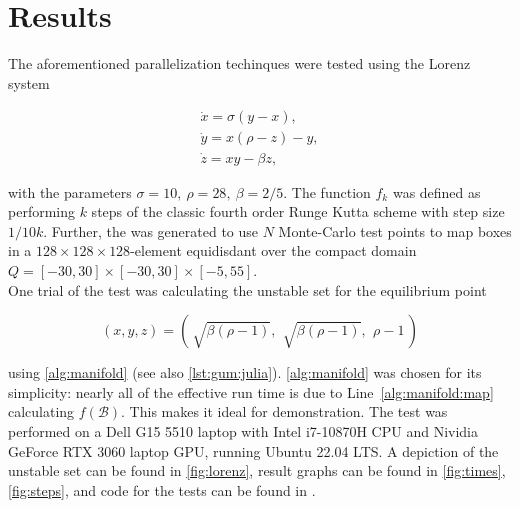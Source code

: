 
\section{Results}

The aforementioned parallelization techinques were tested using the Lorenz system 
\cite*{lorenz}

\begin{gather}
    \dot{x} = \sigma (y - x), \\
    \dot{y} = x (\rho - z) - y, \\
    \dot{z} = xy - \beta z,
\end{gather}

with the parameters $\sigma = 10,\ \rho = 28,\ \beta = 2 / 5$. The function $f_k$ was 
defined as performing $k$ steps of the classic fourth order Runge Kutta scheme 
\cite*{Runge, Kutta} with step 
size $1 / 10 k$. Further, the   was generated to use $N$
Monte-Carlo test points to map boxes in a $128 \times 128 \times 128$-element equidisdant 
 over the compact domain 
$Q = [-30,30] \times [-30,30] \times [-5,55]$. \\

One trial of the test was calculating the unstable set for the equilibrium point 

\begin{equation}
    \label{eq:equilibrium}
    (x, y, z) = \left(\,\sqrt{\beta (\rho - 1)},\,\ \sqrt{\beta (\rho - 1)},\,\ \rho - 1\,\right)
\end{equation}

using \autoref{alg:manifold} (see also \autoref{lst:gum:julia}). \autoref{alg:manifold} 
was chosen for its simplicity: nearly all of the effective run time is due to 
Line~\ref{alg:manifold:map} calculating $f(\mathcal{B})$. This makes it ideal for demonstration. 
The test was performed on a Dell G15 5510 laptop with Intel i7-10870H CPU and Nividia 
GeForce RTX 3060 laptop GPU, running Ubuntu 22.04 LTS. A depiction of the unstable set 
can be found in \autoref{fig:lorenz}, result graphs can be found in \autoref{fig:times}, 
\autoref{fig:steps}, and code for the tests can be found in \cite*{benchmarks}. \\

